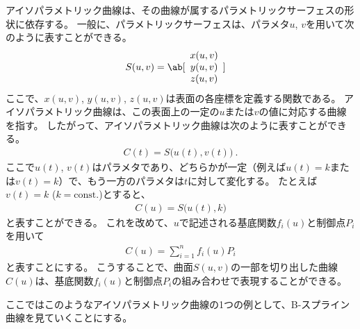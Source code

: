 

アイソパラメトリック曲線は、その曲線が属するパラメトリックサーフェスの形状に依存する。
一般に、パラメトリックサーフェスは、パラメタ$u$, $v$を用いて次のように表すことができる。
\begin{align*}
  S(u, v) &=
  \ab[
  \begin{array}{c}
    x(u, v)\\
    y(u, v)\\
    z(u, v)
  \end{array}
  ]
\end{align*}
ここで、$x(u,v)$, $y(u,v)$, $z(u,v)$は表面の各座標を定義する関数である。
アイソパラメトリック曲線は、この表面上の一定の$u$または$v$の値に対応する曲線を指す。
したがって、アイソパラメトリック曲線は次のように表すことができる。
\begin{align*}
  C(t) = S\big(u(t), v(t)\big)\ .
\end{align*}
ここで$u(t)$, $v(t)$はパラメタであり、どちらかが一定（例えば$u(t)=k$または$v(t)=k$）で、もう一方のパラメタは$t$に対して変化する。
たとえば$v(t) = k$ ($k = \text{const.}$)とすると、
\begin{align*}
  C(u) = S\big(u(t), k\big)
\end{align*}
と表すことができる。
これを改めて、$u$で記述される基底関数$f_i(u)$と制御点$P_i$を用いて
\begin{align*}
  C(u) = \sum_{i=1}^nf_i(u)P_i
\end{align*}
と表すことにする。
こうすることで、曲面$S(u, v)$の一部を切り出した曲線$C(u)$は、基底関数$f_i(u)$と制御点$P_i$の組み合わせで表現することができる。

ここではこのようなアイソパラメトリック曲線の1つの例として、B-スプライン曲線を見ていくことにする。



